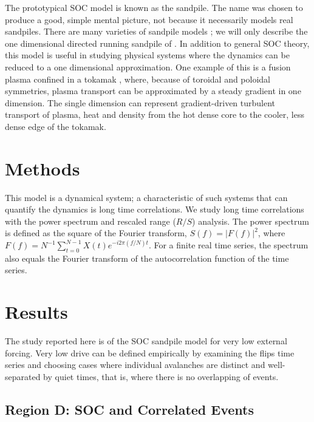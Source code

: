 The prototypical SOC model is known as the sandpile.  The name was
chosen to produce a good, simple mental picture, not because it
necessarily models real sandpiles.  There are many varieties of
sandpile models \cite{btw88a,manna1991a,jensen98a}; we will only
describe the one dimensional directed running sandpile of
\cite{hwakardar92a}. In addition to general SOC theory, this model is
useful in studying physical systems where the dynamics can be reduced
to a one dimensional approximation.  One example of this is a fusion
plasma confined in a tokamak \cite{diamond95a,newman96a}, where,
because of toroidal and poloidal symmetries, plasma transport can be
approximated by a steady gradient in one dimension.  The single
dimension can represent gradient-driven turbulent transport of plasma,
heat and density from the hot dense core to the cooler, less dense
edge of the tokamak.

\section{Methods}
\label{sec:partI_methods}

This model is a dynamical system; a characteristic of such systems
that can quantify the dynamics is long time correlations.  We study
long time correlations with the power spectrum and rescaled range
($R/S$) analysis.  The power spectrum is defined as the square of the
Fourier transform, $S(f) = \left|F(f)\right|^2$, where $F(f) = N^{-1}
\sum_{t = 0}^{N - 1} X(t) e^{-i 2 \pi (f / N) t}$.  For a finite real
time series, the spectrum also equals the Fourier transform of the
autocorrelation function of the time series.

\section{Results}
\label{sec:partI_results:-low-drive}

The study reported here is of the SOC sandpile model for very low
external forcing.  Very low drive can be defined empirically by
examining the flips time series and choosing cases where individual
avalanches are distinct and well-separated by quiet times, that is,
where there is no overlapping of events.  

\subsection{Region D:  SOC and Correlated Events}
\label{sec:partI_region-d:-soc}

